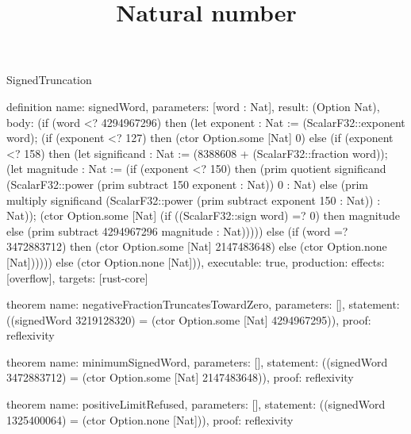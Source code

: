 \begin{lexlean}{SignedTruncation}
\title{Natural number}
\begin{semanticmodule}
definition{
  name: signedWord,
  parameters: [word : Nat],
  result: (Option Nat),
  body: (if (word <? 4294967296) then (let exponent : Nat := (ScalarF32::exponent word); (if (exponent <? 127) then (ctor Option.some [Nat] 0) else (if (exponent <? 158) then (let significand : Nat := (8388608 + (ScalarF32::fraction word)); (let magnitude : Nat := (if (exponent <? 150) then (prim quotient significand (ScalarF32::power (prim subtract 150 exponent : Nat)) 0 : Nat) else (prim multiply significand (ScalarF32::power (prim subtract exponent 150 : Nat)) : Nat)); (ctor Option.some [Nat] (if ((ScalarF32::sign word) =? 0) then magnitude else (prim subtract 4294967296 magnitude : Nat))))) else (if (word =? 3472883712) then (ctor Option.some [Nat] 2147483648) else (ctor Option.none [Nat]))))) else (ctor Option.none [Nat])),
  executable: true,
  production: {effects: [overflow], targets: [rust-core]}
}

theorem{
  name: negativeFractionTruncatesTowardZero,
  parameters: [],
  statement: ((signedWord 3219128320) = (ctor Option.some [Nat] 4294967295)),
  proof: reflexivity{}
}

theorem{
  name: minimumSignedWord,
  parameters: [],
  statement: ((signedWord 3472883712) = (ctor Option.some [Nat] 2147483648)),
  proof: reflexivity{}
}

theorem{
  name: positiveLimitRefused,
  parameters: [],
  statement: ((signedWord 1325400064) = (ctor Option.none [Nat])),
  proof: reflexivity{}
}
\end{semanticmodule}
\end{lexlean}
